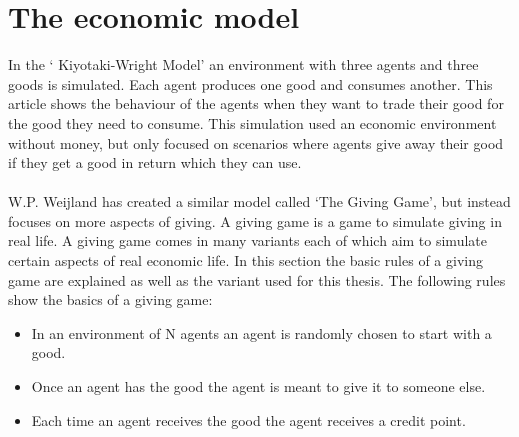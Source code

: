 \documentclass[twoside,openright]{uva-bachelor-thesis}
\begin{document}
\section{The economic model}
In the ‘ Kiyotaki-Wright Model’\cite{moranmoney} an environment with three agents and three goods is simulated. Each agent produces one good and consumes another. This article shows the behaviour of the agents when they want to trade their good for the good they need to consume. This simulation used an economic environment without money, but only focused on scenarios where agents give away their good if they get a good in return which they can use. 
\\
\\
W.P. Weijland has created a similar model called ‘The Giving Game’, but instead focuses on more aspects of giving. A giving game is a game to simulate giving in real life. A giving game comes in many variants each of which aim to simulate certain aspects of real economic life. In this section the basic rules of a giving game are explained as well as the variant used for this thesis.
The following rules show the basics of a giving game:
\begin{itemize}
  \item In an environment of N agents an agent is randomly chosen to start with a good.
  \item Once an agent has the good the agent is meant to give it to someone else.
  \item Each time an agent receives the good the agent receives a credit point.
\end{itemize}
\end{document}
